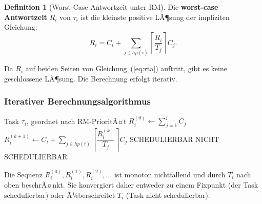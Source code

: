 ﻿\documentclass[a4paper,12pt]{report}
\theoremstyle{definition}
\newtheorem{definition}{Definition}[chapter]
\begin{document}
\begin{definition}[Worst-Case Antwortzeit unter RM]
	Die \textbf{worst-case Antwortzeit} $R_i$ von $\tau_i$ ist die kleinste positive
	LÃ¶sung der impliziten Gleichung:
	\begin{equation}
		R_i = C_i + \sum_{j \in hp(i)} \left\lceil \frac{R_i}{T_j} \right\rceil C_j.
		\label{eq:rta}
	\end{equation}
\end{definition}

Da $R_i$ auf beiden Seiten von Gleichung~(\ref{eq:rta}) auftritt, gibt es keine
geschlossene LÃ¶sung. Die Berechnung erfolgt iterativ.

\subsubsection{Iterativer Berechnungsalgorithmus}

\begin{algorithmic}[1]
	\Require Task $\tau_i$, geordnet nach RM-PrioritÃ¤t
	\State $R_i^{(0)} \leftarrow \sum_{j=1}^{i} C_j$ 
	\Repeat
	\State $R_i^{(k+1)} \leftarrow C_i + \sum_{j \in hp(i)} \left\lceil \dfrac{R_i^{(k)}}{T_j} \right\rceil C_j$
	\State \Return SCHEDULIERBAR
	\Else
	\State \Return NICHT SCHEDULIERBAR
	\EndIf
\end{algorithmic}

Die Sequenz $R_i^{(0)}, R_i^{(1)}, R_i^{(2)}, \ldots$ ist monoton nichtfallend und
durch $T_i$ nach oben beschrÃ¤nkt. Sie konvergiert daher entweder zu einem Fixpunkt
(der Task schedulierbar) oder Ã¼berschreitet $T_i$ (Task nicht schedulierbar).
\end{document}
